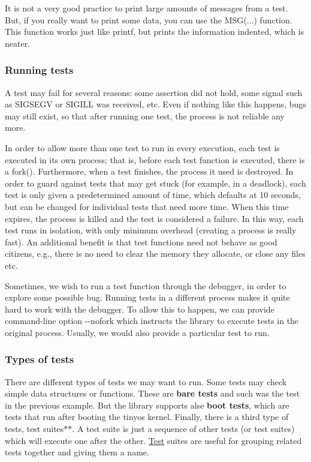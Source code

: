 It is not a very good practice to print large amounts of messages from a test. But, if you really want to print some data, you can use the {\ttfamily M\+SG}(...) function. This function works just like {\ttfamily printf}, but prints the information indented, which is neater.

\subsubsection*{Running tests }

A test may fail for several reasons\+: some assertion did not hold, some signal such as {\ttfamily S\+I\+G\+S\+E\+GV} or {\ttfamily S\+I\+G\+I\+LL} was received, etc. Even if nothing like this happens, bugs may still exist, so that after running one test, the process is not reliable any more.

In order to allow more than one test to run in every execution, each test is executed in its own process; that is, before each test function is executed, there is a fork(). Furthermore, when a test finishes, the process it used is destroyed. In order to guard against tests that may get stuck (for example, in a deadlock), each test is only given a predetermined amount of time, which defaults at 10 seconds, but can be changed for individual tests that need more time. When this time expires, the process is killed and the test is considered a failure. In this way, each test runs in isolation, with only minimum overhead (creating a process is really fast). An additional benefit is that test functions need not behave as good citizens, e.\+g., there is no need to clear the memory they allocate, or close any files etc.

Sometimes, we wish to run a test function through the debugger, in order to explore some possible bug. Running tests in a different process makes it quite hard to work with the debugger. To allow this to happen, we can provide command-\/line option {\ttfamily -\/-\/nofork} which instructs the library to execute tests in the original process. Usually, we would also provide a particular test to run.

\subsubsection*{Types of tests }

There are different types of tests we may want to run. Some tests may check simple data structures or functions. These are {\bfseries bare tests} and such was the test in the previous example. But the library supports alse {\bfseries boot tests}, which are tests that run after booting the tinyos kernel. Finally, there is a third type of tests, test suites$\ast$$\ast$. A test suite is just a sequence of other tests (or test suites) which will execute one after the other. \hyperlink{structTest}{Test} suites are useful for grouping related tests together and giving them a name.

